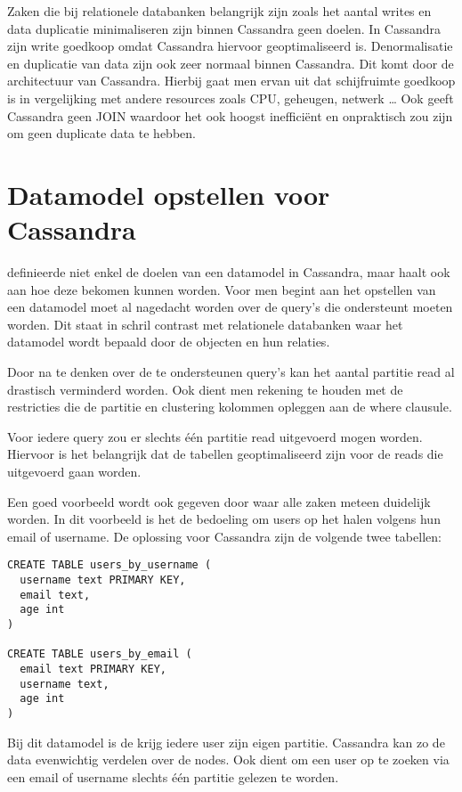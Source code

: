 Zaken die bij relationele databanken belangrijk zijn zoals het aantal writes en data duplicatie minimaliseren zijn binnen Cassandra geen doelen.
In Cassandra zijn write goedkoop omdat Cassandra hiervoor geoptimaliseerd is.
Denormalisatie en duplicatie van data zijn ook zeer normaal binnen Cassandra.
Dit komt door de architectuur van Cassandra.
Hierbij gaat men ervan uit dat schijfruimte goedkoop is in vergelijking met andere resources zoals CPU, geheugen, netwerk \ldots
Ook geeft Cassandra geen JOIN waardoor het ook hoogst inefficiënt en onpraktisch zou zijn om geen duplicate data te hebben.

\section{Datamodel opstellen voor Cassandra}
\cite{Hobbs2015Datamodelling} definieerde niet enkel de doelen van een datamodel in Cassandra, maar haalt ook aan hoe deze bekomen kunnen worden.
Voor men begint aan het opstellen van een datamodel moet al nagedacht worden over de query's die ondersteunt moeten worden.
Dit staat in schril contrast met relationele databanken waar het datamodel wordt bepaald door de objecten en hun relaties.

Door na te denken over de te ondersteunen query's kan het aantal partitie read al drastisch verminderd worden.
Ook dient men rekening te houden met de restricties die de partitie en clustering kolommen opleggen aan de where clausule.

Voor iedere query zou er slechts één partitie read uitgevoerd mogen worden.
Hiervoor is het belangrijk dat de tabellen geoptimaliseerd zijn voor de reads die uitgevoerd gaan worden.

Een goed voorbeeld wordt ook gegeven door \cite{Hobbs2015Datamodelling} waar alle zaken meteen duidelijk worden.
In dit voorbeeld is het de bedoeling om users op het halen volgens hun email of username.
De oplossing voor Cassandra zijn de volgende twee tabellen:

\begin{lstlisting}
CREATE TABLE users_by_username (
  username text PRIMARY KEY,
  email text,
  age int
)

CREATE TABLE users_by_email (
  email text PRIMARY KEY,
  username text,
  age int
)
\end{lstlisting}

Bij dit datamodel is de krijg iedere user zijn eigen partitie.
Cassandra kan zo de data evenwichtig verdelen over de nodes.
Ook dient om een user op te zoeken via een email of username slechts één partitie gelezen te worden.

